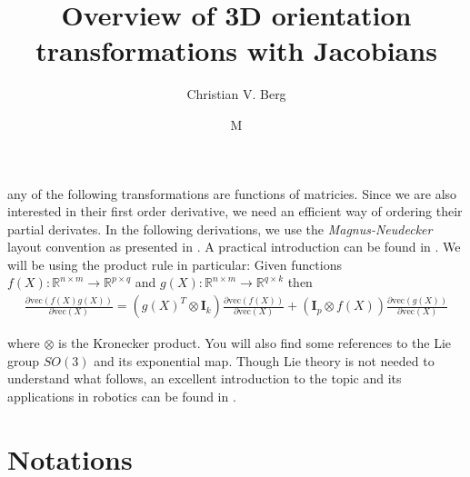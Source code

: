 \documentclass{article}
\newcommand\Real{\mathbb{R}}
\newcommand\vecop[1]{\text{vec} \left( #1\right)}
\begin{document}
\title{Overview of 3D orientation transformations with Jacobians}
\author{Christian V. Berg}
\maketitle
\date

Many of the following transformations are functions of matricies. Since we are
also interested in their first order derivative, we need an efficient way
of ordering their partial derivates. In the following derivations, we use the
\textit{Magnus-Neudecker} layout convention as presented in
\cite{magnus_matrix_1985}. A practical introduction can be found in
\cite{fackler_notes_2005}. We will be using the product rule in particular: Given 
functions $f(X):\Real^{n \times m} \to \Real^{p \times q}$ and
$g(X):\Real^{n \times m} \to \Real^{q \times k}$ then
\begin{align}
  \frac{\partial \vecop{f(X) g(X)}}{\partial \vecop{X}} =
    \left(g(X)^T \otimes \bm{I}_k \right) \frac{\partial \vecop{f(X)}}{\partial \vecop{X}}
    + \left(\bm{I}_p \otimes f(X) \right) \frac{\partial \vecop{g(X)}}{\partial \vecop{X}}
\end{align}

where $\otimes$ is the Kronecker product. You will also find some references to the Lie group $SO(3)$ and its exponential map.
Though Lie theory is not needed to understand what follows, an excellent introduction
to the topic and its applications in robotics can be found in \cite{sola_micro_2019}.


\tableofcontents

\section{Notations}
\end{document}
